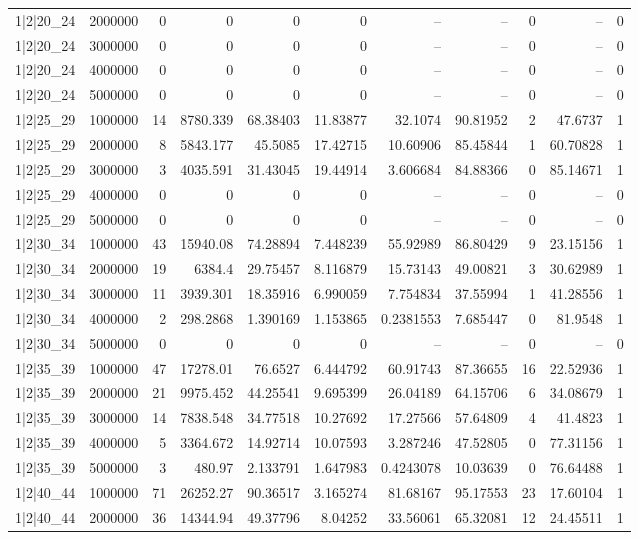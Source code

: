 \begin{tabular}{lrrrrrrrrrr}
1|2|20\_24 & 2000000 & 0 & 0 & 0 & 0 & -- & -- & 0 & -- & 0 \\
1|2|20\_24 & 3000000 & 0 & 0 & 0 & 0 & -- & -- & 0 & -- & 0 \\
1|2|20\_24 & 4000000 & 0 & 0 & 0 & 0 & -- & -- & 0 & -- & 0 \\
1|2|20\_24 & 5000000 & 0 & 0 & 0 & 0 & -- & -- & 0 & -- & 0 \\
1|2|25\_29 & 1000000 & 14 & 8780.339 & 68.38403 & 11.83877 & 32.1074 & 90.81952 & 2 & 47.6737 & 1 \\
1|2|25\_29 & 2000000 & 8 & 5843.177 & 45.5085 & 17.42715 & 10.60906 & 85.45844 & 1 & 60.70828 & 1 \\
1|2|25\_29 & 3000000 & 3 & 4035.591 & 31.43045 & 19.44914 & 3.606684 & 84.88366 & 0 & 85.14671 & 1 \\
1|2|25\_29 & 4000000 & 0 & 0 & 0 & 0 & -- & -- & 0 & -- & 0 \\
1|2|25\_29 & 5000000 & 0 & 0 & 0 & 0 & -- & -- & 0 & -- & 0 \\
1|2|30\_34 & 1000000 & 43 & 15940.08 & 74.28894 & 7.448239 & 55.92989 & 86.80429 & 9 & 23.15156 & 1 \\
1|2|30\_34 & 2000000 & 19 & 6384.4 & 29.75457 & 8.116879 & 15.73143 & 49.00821 & 3 & 30.62989 & 1 \\
1|2|30\_34 & 3000000 & 11 & 3939.301 & 18.35916 & 6.990059 & 7.754834 & 37.55994 & 1 & 41.28556 & 1 \\
1|2|30\_34 & 4000000 & 2 & 298.2868 & 1.390169 & 1.153865 & 0.2381553 & 7.685447 & 0 & 81.9548 & 1 \\
1|2|30\_34 & 5000000 & 0 & 0 & 0 & 0 & -- & -- & 0 & -- & 0 \\
1|2|35\_39 & 1000000 & 47 & 17278.01 & 76.6527 & 6.444792 & 60.91743 & 87.36655 & 16 & 22.52936 & 1 \\
1|2|35\_39 & 2000000 & 21 & 9975.452 & 44.25541 & 9.695399 & 26.04189 & 64.15706 & 6 & 34.08679 & 1 \\
1|2|35\_39 & 3000000 & 14 & 7838.548 & 34.77518 & 10.27692 & 17.27566 & 57.64809 & 4 & 41.4823 & 1 \\
1|2|35\_39 & 4000000 & 5 & 3364.672 & 14.92714 & 10.07593 & 3.287246 & 47.52805 & 0 & 77.31156 & 1 \\
1|2|35\_39 & 5000000 & 3 & 480.97 & 2.133791 & 1.647983 & 0.4243078 & 10.03639 & 0 & 76.64488 & 1 \\
1|2|40\_44 & 1000000 & 71 & 26252.27 & 90.36517 & 3.165274 & 81.68167 & 95.17553 & 23 & 17.60104 & 1 \\
1|2|40\_44 & 2000000 & 36 & 14344.94 & 49.37796 & 8.04252 & 33.56061 & 65.32081 & 12 & 24.45511 & 1 \\

\end{tabular}
